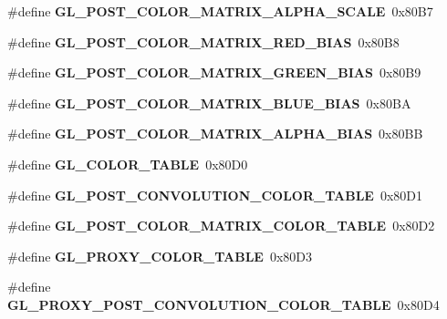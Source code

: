 \begin{DoxyCompactItemize}
\item 
\#define {\bfseries G\+L\+\_\+\+P\+O\+S\+T\+\_\+\+C\+O\+L\+O\+R\+\_\+\+M\+A\+T\+R\+I\+X\+\_\+\+A\+L\+P\+H\+A\+\_\+\+S\+C\+A\+L\+E}~0x80\+B7\label{_s_d_l__opengl_8h_a501b391e69fd678e081402dc457233c2}

\item 
\#define {\bfseries G\+L\+\_\+\+P\+O\+S\+T\+\_\+\+C\+O\+L\+O\+R\+\_\+\+M\+A\+T\+R\+I\+X\+\_\+\+R\+E\+D\+\_\+\+B\+I\+A\+S}~0x80\+B8\label{_s_d_l__opengl_8h_a47acaeed7320bc1c6bce0fee1fa2d5d5}

\item 
\#define {\bfseries G\+L\+\_\+\+P\+O\+S\+T\+\_\+\+C\+O\+L\+O\+R\+\_\+\+M\+A\+T\+R\+I\+X\+\_\+\+G\+R\+E\+E\+N\+\_\+\+B\+I\+A\+S}~0x80\+B9\label{_s_d_l__opengl_8h_a3156ca5678724982c303956e282a8d55}

\item 
\#define {\bfseries G\+L\+\_\+\+P\+O\+S\+T\+\_\+\+C\+O\+L\+O\+R\+\_\+\+M\+A\+T\+R\+I\+X\+\_\+\+B\+L\+U\+E\+\_\+\+B\+I\+A\+S}~0x80\+B\+A\label{_s_d_l__opengl_8h_aee6e70167ae07c1e9281687f85e9bf13}

\item 
\#define {\bfseries G\+L\+\_\+\+P\+O\+S\+T\+\_\+\+C\+O\+L\+O\+R\+\_\+\+M\+A\+T\+R\+I\+X\+\_\+\+A\+L\+P\+H\+A\+\_\+\+B\+I\+A\+S}~0x80\+B\+B\label{_s_d_l__opengl_8h_a5b08611083e7ee30f7d2219a79f292a9}

\item 
\#define {\bfseries G\+L\+\_\+\+C\+O\+L\+O\+R\+\_\+\+T\+A\+B\+L\+E}~0x80\+D0\label{_s_d_l__opengl_8h_a15ed9454505d8ed1b3f3598d231ed9fc}

\item 
\#define {\bfseries G\+L\+\_\+\+P\+O\+S\+T\+\_\+\+C\+O\+N\+V\+O\+L\+U\+T\+I\+O\+N\+\_\+\+C\+O\+L\+O\+R\+\_\+\+T\+A\+B\+L\+E}~0x80\+D1\label{_s_d_l__opengl_8h_aa497771906b9d63ecd2e43db2fa96283}

\item 
\#define {\bfseries G\+L\+\_\+\+P\+O\+S\+T\+\_\+\+C\+O\+L\+O\+R\+\_\+\+M\+A\+T\+R\+I\+X\+\_\+\+C\+O\+L\+O\+R\+\_\+\+T\+A\+B\+L\+E}~0x80\+D2\label{_s_d_l__opengl_8h_a2befa03ff3c64e5bfd7f870f546fcbb4}

\item 
\#define {\bfseries G\+L\+\_\+\+P\+R\+O\+X\+Y\+\_\+\+C\+O\+L\+O\+R\+\_\+\+T\+A\+B\+L\+E}~0x80\+D3\label{_s_d_l__opengl_8h_afa0aeb76019d88f6aabdd78bd9f99255}

\item 
\#define {\bfseries G\+L\+\_\+\+P\+R\+O\+X\+Y\+\_\+\+P\+O\+S\+T\+\_\+\+C\+O\+N\+V\+O\+L\+U\+T\+I\+O\+N\+\_\+\+C\+O\+L\+O\+R\+\_\+\+T\+A\+B\+L\+E}~0x80\+D4\label{_s_d_l__opengl_8h_aea3b3835746e512db9dd4d8faa53802d}


\end{DoxyCompactItemize}
